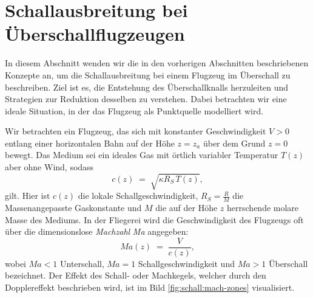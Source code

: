 %
%
%
%
\section{Schallausbreitung bei Überschallflugzeugen
\label{schall:section:teil3}}

In diesem Abschnitt wenden wir die in den vorherigen Abschnitten
beschriebenen Konzepte an, um die Schallausbreitung bei einem
Flugzeug im Überschall zu beschreiben.
Ziel ist es, die Entstehung des Überschallknalls herzuleiten und Strategien
zur Reduktion desselben zu verstehen.
Dabei betrachten wir eine ideale Situation, in der das Flugzeug als
Punktquelle modelliert wird.

Wir betrachten ein Flugzeug, das sich mit konstanter Geschwindigkeit
$V>0$ entlang einer horizontalen Bahn auf der Höhe $z=z_a$ über
dem Grund $z=0$ bewegt.
Das Medium sei ein ideales Gas mit örtlich variabler Temperatur
$T(z)$ aber ohne Wind, sodass
\begin{equation}
    c(z) \;=\; \sqrt{\kappa R_S\,T(z)} ,
    \label{eq:c-of-z}
\end{equation}
gilt. Hier ist $c(z)$ die lokale Schallgeschwindigkeit, $R_S = \frac{R}{M}$
die Massenangepasste Gaskonstante und $M$ die auf der Höhe $z$ herrschende
molare Masse des Mediums.
In der Fliegerei wird die Geschwindigkeit des Flugzeugs oft über die
dimensionslose \emph{Machzahl} \textit{Ma} angegeben:
\begin{equation}
    \textit{Ma}(z) \;=\; \frac{V}{c(z)},
    \label{eq:mach-number}
\end{equation}
wobei $\textit{Ma}<1$ Unterschall, $\textit{Ma}=1$ Schallgeschwindigkeit
und $\textit{Ma}>1$ Überschall bezeichnet.
Der Effekt des Schall- oder Machkegels, welcher durch den Dopplereffekt
beschrieben wird, ist im Bild \ref{fig:schall:mach-zones} visualisiert.

